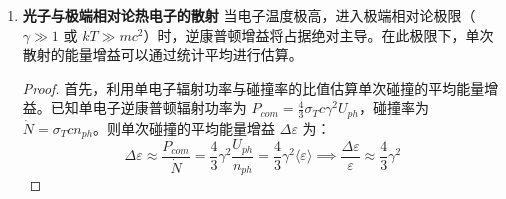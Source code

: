 \begin{enumerate}[label = (\arabic*)]
\begin{proof}
    代入平衡条件 $0 = -\langle \varepsilon^2 \rangle / mc^2 + \alpha kT \langle \varepsilon \rangle / mc^2$，得：
    \begin{equation}
        -12(kT)^2 + \alpha kT (3kT) = 0 \implies 3\alpha = 12 \implies \alpha = 4
    \end{equation}
    由此得到非相对论热散射的相对能量变化率：
    \begin{tcolorbox}[colframe=black, colback=white, boxrule=0.5pt, arc=0pt]
    \begin{equation}
        \left( \frac{\Delta \varepsilon}{\varepsilon} \right)_{NR} = \frac{4kT - \varepsilon}{mc^2}
    \end{equation}
    \end{tcolorbox}
    \end{proof}

    \begin{itemize}
        \item 若 $4kT > \varepsilon$：光子从电子获得能量，表现为逆康普顿加热。
        \item 若 $4kT < \varepsilon$：光子损失能量给电子，表现为电子热运动导致的康普顿冷却。
    \end{itemize}

\item \textbf{光子与极端相对论热电子的散射}
    当电子温度极高，进入极端相对论极限（$\gamma \gg 1$ 或 $kT \gg mc^2$）时，逆康普顿增益将占据绝对主导。在此极限下，单次散射的能量增益可以通过统计平均进行估算。
    \begin{proof}
        首先，利用单电子辐射功率与碰撞率的比值估算单次碰撞的平均能量增益。已知单电子逆康普顿辐射功率为 $P_{com} = \frac{4}{3}\sigma_T c \gamma^2 U_{ph}$，碰撞率为 $\dot{N} = \sigma_T c n_{ph}$。则单次碰撞的平均能量增益 $\Delta \varepsilon$ 为：
        \begin{equation}
            \Delta \varepsilon \approx \frac{P_{com}}{\dot{N}} = \frac{4}{3}\gamma^2 \frac{U_{ph}}{n_{ph}} = \frac{4}{3}\gamma^2 \langle \varepsilon \rangle \implies \frac{\Delta \varepsilon}{\varepsilon} \approx \frac{4}{3}\gamma^2
        \end{equation}


\end{proof}
\end{enumerate}

